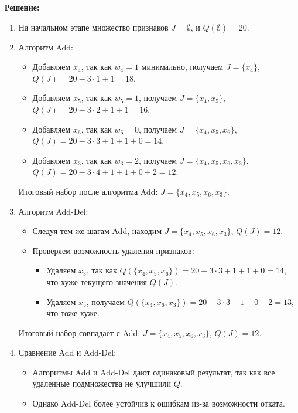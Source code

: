 \textbf{Решение:}

\begin{enumerate}
    \item На начальном этапе множество признаков $J = \emptyset$, и $Q(\emptyset) = 20$.
    \item Алгоритм Add:
          \begin{itemize}
              \item Добавляем $x_4$, так как $w_4 = 1$ минимально, получаем $J = \{x_4\}$, $Q(J) = 20 - 3 \cdot 1 + 1 = 18$.
              \item Добавляем $x_5$, так как $w_5 = 1$, получаем $J = \{x_4, x_5\}$, $Q(J) = 20 - 3 \cdot 2 + 1 + 1 = 16$.
              \item Добавляем $x_6$, так как $w_6 = 0$, получаем $J = \{x_4, x_5, x_6\}$, $Q(J) = 20 - 3 \cdot 3 + 1 + 1 + 0 = 14$.
              \item Добавляем $x_3$, так как $w_3 = 2$, получаем $J = \{x_4, x_5, x_6, x_3\}$, $Q(J) = 20 - 3 \cdot 4 + 1 + 1 + 0 + 2 = 12$.
          \end{itemize}
          Итоговый набор после алгоритма Add: $J = \{x_4, x_5, x_6, x_3\}$.

    \item Алгоритм Add-Del:
          \begin{itemize}
              \item Следуя тем же шагам Add, находим $J = \{x_4, x_5, x_6, x_3\}$, $Q(J) = 12$.
              \item Проверяем возможность удаления признаков:
                    \begin{itemize}
                        \item Удаляем $x_3$, так как $Q(\{x_4, x_5, x_6\}) = 20 - 3 \cdot 3 + 1 + 1 + 0 = 14$, что хуже текущего значения $Q(J)$.
                        \item Удаляем $x_5$, получаем $Q(\{x_4, x_6, x_3\}) = 20 - 3 \cdot 3 + 1 + 0 + 2 = 13$, что тоже хуже.
                    \end{itemize}
          \end{itemize}
          Итоговый набор совпадает с Add: $J = \{x_4, x_5, x_6, x_3\}$, $Q(J) = 12$.

    \item Сравнение Add и Add-Del:
          \begin{itemize}
              \item Алгоритмы Add и Add-Del дают одинаковый результат, так как все удаленные подмножества не улучшили $Q$.
              \item Однако Add-Del более устойчив к ошибкам из-за возможности отката.
          \end{itemize}
\end{enumerate}

